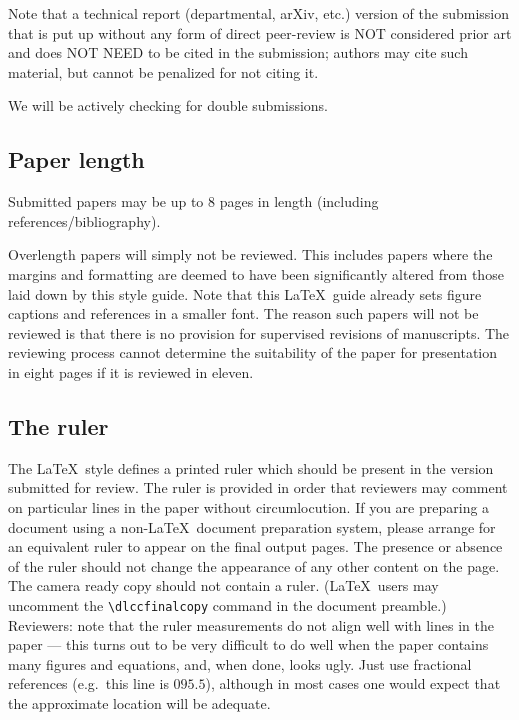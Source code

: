 Note that a technical report (departmental, arXiv, etc.) version of the submission that is put up without any form of direct peer-review is NOT considered prior art and does NOT NEED to be cited in the submission; authors may cite such material, but cannot be penalized for not citing it.

We will be actively checking for double submissions.

\subsection{Paper length}
Submitted papers may be up to 8 pages in length (including references/bibliography). 

Overlength papers will simply not be reviewed.
This includes papers where the margins and formatting are deemed to have been significantly altered from those laid down by this style guide. 
Note that this \LaTeX\ guide already sets figure captions and references in a smaller font.
The reason such papers will not be reviewed is that there is no provision for supervised revisions of manuscripts.
The reviewing process cannot determine the suitability of the paper for presentation in eight pages if it is reviewed in eleven.  

\subsection{The ruler}
The \LaTeX\ style defines a printed ruler which should be present in the version submitted for review.
The ruler is provided in order that reviewers may comment on particular lines in the paper without
circumlocution.
If you are preparing a document using a non-\LaTeX\ document preparation system, please arrange for an equivalent ruler to appear on the final output pages.
The presence or absence of the ruler should not change the appearance of any other content on the page.
The camera ready copy should not contain a ruler. (\LaTeX\ users may uncomment the \verb'\dlccfinalcopy' command in the document preamble.)
Reviewers: note that the ruler measurements do not align well with lines in the paper --- this turns out to be very difficult to do well when the paper contains many figures and equations, and, when done, looks ugly.
Just use fractional references (e.g.\ this line is $095.5$), although in most cases one would expect that the approximate location will be adequate.

